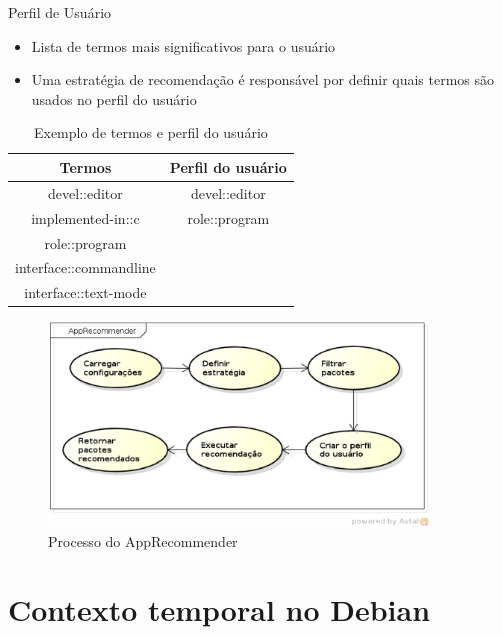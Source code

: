 \begin{frame}
    Perfil de Usuário
    \begin{itemize}
        \item Lista de termos mais significativos para o usuário
        \item Uma estratégia de recomendação é responsável por definir quais termos
        são usados no perfil do usuário
    \end{itemize}

    \begin{table}[h]
    \centering
    \begin{tabular}{cc}
    \hline
    \rowcolor[HTML]{EFEFEF}
    {Termos} & {Perfil do usuário} \\ \hline
    {devel::editor} & {devel::editor} \\ \hline
    {implemented-in::c} & {role::program} \\ \hline
    {role::program} & {} \\ \hline
    {interface::commandline} & {} \\ \hline
    {interface::text-mode} & {} \\ \hline
    \end{tabular}
    \caption{Exemplo de termos e perfil do usuário}
    \label{tab:classificacao_pacotes}
    \end{table}
\end{frame}

\begin{frame}
\begin{figure}[h]
  \centering
  \includegraphics[width=0.9\textwidth]{figura/app_recommender_process.eps}
  \caption{Processo do AppRecommender}
  \label{fig:curva_aprendizado}
\end{figure}
\end{frame}

\section{Contexto temporal no Debian} %
\label{sec:d}


